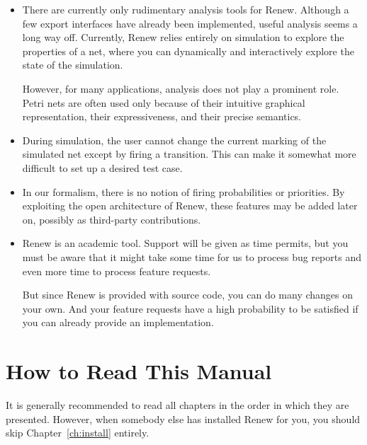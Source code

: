 \begin{itemize}
\item There are currently only rudimentary analysis tools for Renew. 
Although a few export interfaces have already been implemented,
useful analysis seems a long way off.
Currently, Renew relies entirely on simulation to explore the
properties of a net, where you can dynamically and
interactively explore the state of the simulation.

However, for many applications, analysis does not play a
prominent role. Petri nets are often used only because of
their intuitive graphical representation, their expressiveness,
and their precise semantics.

\item During simulation, the user cannot change the current 
marking of the simulated net except by firing a transition.
This can make it somewhat more difficult to set up a desired 
test case.

\item In our formalism, there is no notion of firing probabilities
or priorities. By exploiting the open architecture of Renew,
these features may be added later on, possibly
as third-party contributions. 

\item Renew is an academic tool. Support will be given as
time permits, but you must be aware that it might take
some time for us to process bug reports and even more time
to process feature requests.

But since Renew is provided with source code, you can do many
changes on your own. And your feature requests have
a high probability to be satisfied if you
can already provide an implementation.
\end{itemize}


\section{How to Read This Manual}

It is generally recommended to read all chapters in
the order in which they are presented. However, when somebody else
has installed Renew for you, you should skip 
Chapter~\ref{ch:install} entirely.


